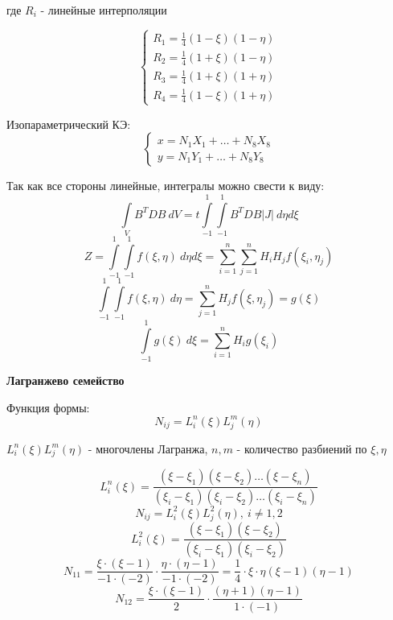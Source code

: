 \documentclass{bmstu}
\begin{document}
где $R_i$ - линейные интерполяции

\[
\begin{cases}
	R_1=\frac{1}{4}(1-\xi)(1-\eta) \\
	R_2=\frac{1}{4}(1+\xi)(1-\eta) \\
	R_3=\frac{1}{4}(1+\xi)(1+\eta) \\
	R_4=\frac{1}{4}(1-\xi)(1+\eta)
\end{cases}
\]

Изопараметрический КЭ:
\[
\begin{cases}
	x=N_1X_1+\dots+N_8X_8 \\
	y=N_1Y_1+\dots+N_8Y_8
\end{cases}
\]

Так как все стороны линейные, интегралы можно свести к виду:
\[
\int\limits_VB^TDB\ dV=t\int\limits_{-1}^1\int\limits_{-1}^1 B^TDB |J|\ d\eta d\xi
\]
\[
Z=\int\limits_{-1}^1\int\limits_{-1}^1 f(\xi, \eta) \ d\eta d\xi = \sum\limits_{i=1}^{n}\sum\limits_{j=1}^{n}H_iH_j f(\xi_i, \eta_j)
\]
\[
\int\limits_{-1}^1\int\limits_{-1}^1 f(\xi, \eta) \ d\eta =\sum\limits_{j=1}^{n} H_j f (\xi, \eta_j) = g(\xi)
\]
\[
\int\limits_{-1}^1 g(\xi)\ d\xi = \sum\limits_{i=1}^{n} H_i g(\xi_i)
\]

\begin{center}
	\textbf{Лагранжево семейство}
\end{center}

Функция формы:
\[
N_{ij}=L_i^n(\xi)L_j^m(\eta)
\]

$L_i^n(\xi)L_j^m(\eta)$ - многочлены Лагранжа, $n,m$ - количество разбиений по $\xi, \eta$

\[
L_i^n(\xi)=\frac{(\xi-\xi_1)(\xi-\xi_2)\dots(\xi-\xi_n)}{(\xi_i-\xi_1)(\xi_i-\xi_2)\dots(\xi_i-\xi_n)}
\]
\[
N_{ij}=L_i^2(\xi)L_j^2(\eta),\ i \neq 1,2
\]
\[
L_i^2(\xi)=\frac{(\xi-\xi_1)(\xi-\xi_2)}{(\xi_i-\xi_1)(\xi_i-\xi_2)}
\]
\[
N_{11}=\frac{\xi\cdot(\xi-1)}{-1\cdot(-2)}\cdot \frac{\eta\cdot(\eta-1)}{-1\cdot(-2)}=\frac{1}{4}\cdot\xi\cdot\eta (\xi-1)(\eta-1)
\]
\[
N_{12}=\frac{\xi\cdot(\xi-1)}{2}\cdot \frac{(\eta+1)(\eta-1)}{1\cdot(-1)}
\]
\end{document}
